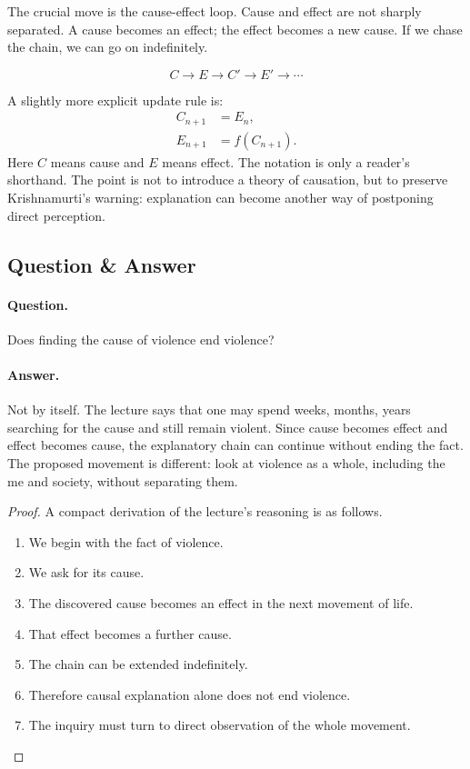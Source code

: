 The crucial move is the cause-effect loop. Cause and effect are not sharply separated. A cause becomes an effect; the effect becomes a new cause. If we chase the chain, we can go on indefinitely.

\begin{equation}
C \rightarrow E \rightarrow C' \rightarrow E' \rightarrow \cdots
\end{equation}

A slightly more explicit update rule is:
\begin{align}
C_{n+1} &= E_n,\\
E_{n+1} &= f(C_{n+1}).
\end{align}
Here \(C\) means cause and \(E\) means effect. The notation is only a reader's shorthand. The point is not to introduce a theory of causation, but to preserve Krishnamurti's warning: explanation can become another way of postponing direct perception.

\subsection{Question \& Answer}

\paragraph{Question.}
Does finding the cause of violence end violence?

\paragraph{Answer.}
Not by itself. The lecture says that one may spend weeks, months, years searching for the cause and still remain violent. Since cause becomes effect and effect becomes cause, the explanatory chain can continue without ending the fact. The proposed movement is different: look at violence as a whole, including the me and society, without separating them.

\begin{proof}
A compact derivation of the lecture's reasoning is as follows.
\begin{enumerate}
\item We begin with the fact of violence.
\item We ask for its cause.
\item The discovered cause becomes an effect in the next movement of life.
\item That effect becomes a further cause.
\item The chain can be extended indefinitely.
\item Therefore causal explanation alone does not end violence.
\item The inquiry must turn to direct observation of the whole movement.
\end{enumerate}
\end{proof}

